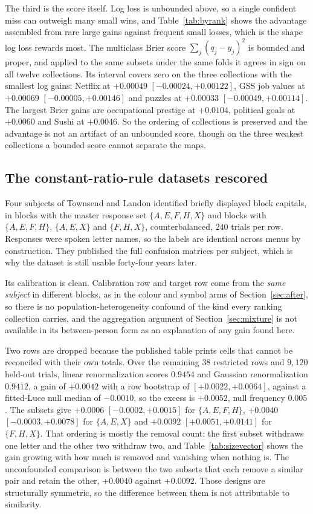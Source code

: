 \documentclass[11pt]{article}
\theoremstyle{italichead}
\begin{document}
The third is the score itself. Log loss is unbounded above, so a single confident miss can
outweigh many small wins, and Table~\ref{tab:byrank} shows
the advantage assembled from rare large gains against frequent small losses, which is the shape
log loss rewards most. The multiclass Brier score $\sum_j (q_j - y_j)^2$ is bounded and proper,
and applied to the same subsets under the same folds it agrees in sign on all twelve
collections. Its interval covers zero on the three collections with the smallest log gains:
Netflix at $+0.00049$ $[-0.00024, +0.00122]$, GSS job values at $+0.00069$
$[-0.00005, +0.00146]$ and puzzles at $+0.00033$ $[-0.00049, +0.00114]$. The largest Brier gains
are occupational prestige at $+0.0104$, political goals at $+0.0060$ and Sushi at $+0.0046$. So
the ordering of collections is preserved and the advantage is not an artifact of an unbounded
score, though on the three weakest collections a bounded score cannot separate the maps.

\subsection{The constant-ratio-rule datasets rescored}
\label{sec:townsend}

Four subjects of Townsend and Landon \cite{townsendlandon1982} identified briefly displayed block capitals, in blocks with the
master response set $\{A,E,F,H,X\}$ and blocks with $\{A,E,F,H\}$, $\{A,E,X\}$ and
$\{F,H,X\}$, counterbalanced, $240$ trials per row. Responses were spoken letter names, so
the labels are identical across menus by construction. They published the full confusion
matrices per subject, which is why the dataset is still usable forty-four years later.

Its calibration is clean. Calibration row and target row come from the \emph{same subject} in
different blocks, as in the colour and symbol arms of Section~\ref{sec:after}, so
there is no population-heterogeneity confound of the kind every ranking collection carries,
and the aggregation argument of Section~\ref{sec:mixture} is not available in its
between-person form as an explanation of any gain found here.

Two rows are dropped because the published table prints cells that cannot be reconciled with
their own totals. Over the remaining $38$ restricted rows and $9{,}120$ held-out trials, linear
renormalization scores $0.9454$ and
Gaussian renormalization $0.9412$, a gain of $+0.0042$ with a row bootstrap of $[+0.0022, +0.0064]$, against
a fitted-Luce null median of $-0.0010$, so the excess is $+0.0052$, null frequency $0.005$. The
subsets give $+0.0006$ $[-0.0002, +0.0015]$ for $\{A,E,F,H\}$, $+0.0040$
$[-0.0003, +0.0078]$ for $\{A,E,X\}$ and $+0.0092$ $[+0.0051, +0.0141]$ for $\{F,H,X\}$.
That ordering is mostly the removal count: the first subset withdraws one letter and the
other two withdraw two, and Table~\ref{tab:sizevector} shows the gain growing with how much is
removed and vanishing when nothing is. The unconfounded comparison is between the two subsets
that each remove a similar pair and retain the other, $+0.0040$ against $+0.0092$. Those designs
are structurally symmetric, so the difference between them is not attributable to similarity.
\end{document}
